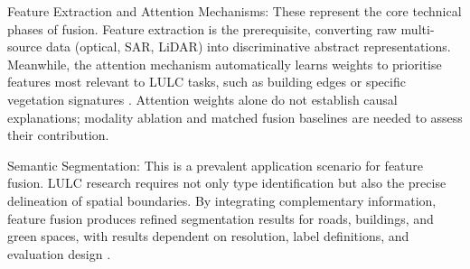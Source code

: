 \documentclass[]{interact}
\theoremstyle{plain}%
\theoremstyle{definition}
\theoremstyle{remark}
\DeclareRobustCommand{\DIFadd}[1]{{\protect\color{DIFaddcolor}\uwave{#1}}}
\DeclareRobustCommand{\DIFdel}[1]{{\protect\color{DIFdelcolor}\sout{#1}}}
\def\DIFadd#1{#1}%
\def\DIFdel#1{}%
\begin{document}
\medskip
Feature Extraction and Attention Mechanisms: These represent the core technical phases of fusion. Feature extraction is the prerequisite, converting raw multi-source data (optical, SAR, LiDAR) into discriminative abstract representations. Meanwhile, the attention mechanism \DIFdel{acts} \DIFdel{as} \DIFdel{an} \DIFdel{intelligent} \DIFdel{regulator}\DIFdel{,} automatically \DIFdel{learning} \DIFadd{learns} weights to \DIFdel{prioritize} \DIFadd{prioritise} features most relevant to LULC tasks, such as building edges or specific vegetation signatures \citep{46, 47}. \DIFadd{Attention} \DIFadd{weights} \DIFadd{alone} \DIFadd{do} \DIFadd{not} \DIFadd{establish} \DIFadd{causal} \DIFadd{explanations}\DIFadd{;} \DIFadd{modality} \DIFadd{ablation} \DIFadd{and} \DIFadd{matched} \DIFadd{fusion} \DIFadd{baselines} \DIFadd{are} \DIFadd{needed} \DIFadd{to} \DIFadd{assess} \DIFadd{their} \DIFadd{contribution}\DIFadd{.}

\medskip
Semantic Segmentation: This is \DIFdel{the} \DIFdel{most} \DIFadd{a} prevalent application scenario for feature fusion. LULC research requires not only type identification but also the precise delineation of spatial boundaries. By integrating complementary information, feature fusion produces refined segmentation results for roads, buildings, and green spaces, \DIFdel{meeting} \DIFdel{the} \DIFdel{demand} \DIFdel{for} \DIFdel{`}\DIFdel{`}\DIFdel{precision} \DIFdel{geoscience''} \DIFadd{with} \DIFadd{results} \DIFadd{dependent} \DIFadd{on} \DIFadd{resolution}\DIFadd{,} \DIFadd{label} \DIFadd{definitions}\DIFadd{,} \DIFadd{and} \DIFadd{evaluation} \DIFadd{design} \citep{45, 48}.
\end{document}
